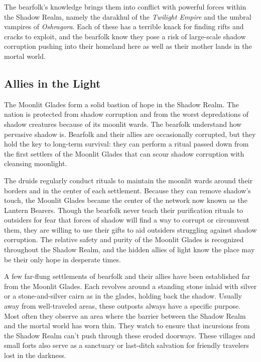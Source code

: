 \documentclass[10pt,a4paper,twoside,bg=print,twocolumn,openany,nodeprecatedcode]{dndbook}
\begin{document}
The bearfolk's knowledge brings them into conflict with powerful forces within the Shadow Realm, namely the darakhul of the \textit{Twilight Empire} and the umbral vampires of \textit{Oshragora}. Each of these has a terrible knack for finding rifts and cracks to exploit, and the bearfolk know they pose a risk of large-scale shadow corruption pushing into their homeland here as well as their mother lands in the mortal world.

\subsection{Allies in the Light}
The Moonlit Glades form a solid bastion of hope in the Shadow Realm. The nation is protected from shadow corruption and from the worst depredations of shadow creatures because of its moonlit wards. The bearfolk understand how pervasive shadow is. Bearfolk and their allies are occasionally corrupted, but they hold the key to long-term survival: they can perform a ritual passed down from the first settlers of the Moonlit Glades that can scour shadow corruption with cleansing moonlight.

The druids regularly conduct rituals to maintain the moonlit wards around their borders and in the center of each settlement. Because they can remove shadow's touch, the Moonlit Glades became the center of the network now known as the Lantern Bearers. Though the bearfolk never teach their purification rituals to outsiders for fear that forces of shadow will find a way to corrupt or circumvent them, they are willing to use their gifts to aid outsiders struggling against shadow corruption. The relative safety and purity of the Moonlit Glades is recognized throughout the Shadow Realm, and the hidden allies of light know the place may be their only hope in desperate times.

A few far-flung settlements of bearfolk and their allies have been established far from the Moonlit Glades. Each revolves around a standing stone inlaid with silver or a stone-and-silver cairn as in the glades, holding back the shadow. Usually away from well-traveled areas, these outposts always have a specific purpose. Most often they observe an area where the barrier between the Shadow Realm and the mortal world has worn thin. They watch to ensure that incursions from the Shadow Realm can't push through these eroded doorways. These villages and small forts also serve as a sanctuary or last-ditch salvation for friendly travelers lost in the darkness.
\end{document}
